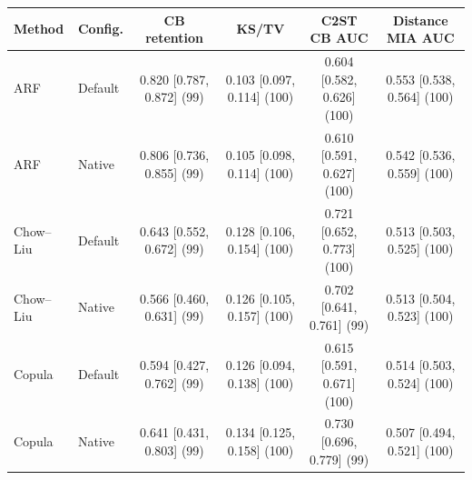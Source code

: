 \begin{tabular}{@{}llcccc@{}}
\toprule
Method & Config. & CB retention & KS/TV & C2ST CB AUC & Distance MIA AUC \\
\midrule
ARF & Default & 0.820 [0.787, 0.872] (99) & 0.103 [0.097, 0.114] (100) & 0.604 [0.582, 0.626] (100) & 0.553 [0.538, 0.564] (100) \\
ARF & Native & 0.806 [0.736, 0.855] (99) & 0.105 [0.098, 0.114] (100) & 0.610 [0.591, 0.627] (100) & 0.542 [0.536, 0.559] (100) \\
Chow--Liu & Default & 0.643 [0.552, 0.672] (99) & 0.128 [0.106, 0.154] (100) & 0.721 [0.652, 0.773] (100) & 0.513 [0.503, 0.525] (100) \\
Chow--Liu & Native & 0.566 [0.460, 0.631] (99) & 0.126 [0.105, 0.157] (100) & 0.702 [0.641, 0.761] (99) & 0.513 [0.504, 0.523] (100) \\
Copula & Default & 0.594 [0.427, 0.762] (99) & 0.126 [0.094, 0.138] (100) & 0.615 [0.591, 0.671] (100) & 0.514 [0.503, 0.524] (100) \\
Copula & Native & 0.641 [0.431, 0.803] (99) & 0.134 [0.125, 0.158] (100) & 0.730 [0.696, 0.779] (99) & 0.507 [0.494, 0.521] (100) \\
\bottomrule
\end{tabular}
